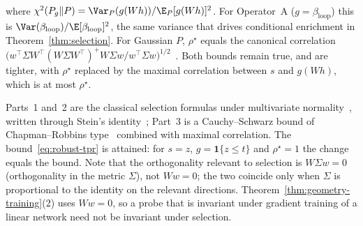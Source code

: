 \begin{theorem}
\begin{enumerate}
\begin{align}
  \end{align}
  where $\chi^2(P_g \| P) = \Var_P(g(Wh)) / \E_P[g(Wh)]^2$. For Operator~A ($g = \beta_{\mathrm{loop}}$) this is $\Var(\beta_{\mathrm{loop}})/\E[\beta_{\mathrm{loop}}]^2$, the same variance that drives conditional enrichment in Theorem~\ref{thm:selection}. For Gaussian $P$, $\rho^\star$ equals the canonical correlation $\big(w^\top \Sigma W^\top (W\Sigma W^\top)^{+} W \Sigma w / w^\top \Sigma w\big)^{1/2}$~\cite{lancaster1957,kolmogorov1960}. Both bounds remain true, and are tighter, with $\rho^\star$ replaced by the maximal correlation between $s$ and $g(Wh)$, which is at most $\rho^\star$.
\end{enumerate}
\end{theorem}

Parts~1 and~2 are the classical selection formulas under multivariate normality~\cite{pearson1903,aitken1934,lawley1943}, written through Stein's identity~\cite{stein1981}; Part~3 is a Cauchy--Schwarz bound of Chapman--Robbins type~\cite{chapman1951} combined with maximal correlation. The bound~\eqref{eq:robust-tpr} is attained: for $s = z$, $g = \mathbf{1}\{z \le t\}$ and $\rho^\star = 1$ the change equals the bound. Note that the orthogonality relevant to selection is $W\Sigma w = 0$ (orthogonality in the metric $\Sigma$), not $Ww = 0$; the two coincide only when $\Sigma$ is proportional to the identity on the relevant directions. Theorem~\ref{thm:geometry-training}(2) uses $Ww = 0$, so a probe that is invariant under gradient training of a linear network need not be invariant under selection.


